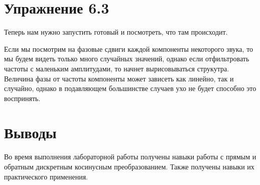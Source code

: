 \documentclass[a4paper,12pt]{report}
\begin{document}
\chapter{Упражнение 6.3}

 Теперь нам нужно запустить готовый  и посмотреть, что там происходит.
    
    Если мы посмотрим на фазовые сдвиги каждой компоненты некоторого звука, то мы будем видеть только много случайных значений, однако если отфильтровать частоты с маленьким амплитудами, то начнет вырисовываться струкутра. Величина фазы от частоты компоненты может зависеть как линейно, так и случайно, однако в подавляющем большинстве случаев ухо не будет способно это воспринять.
    
    

\chapter{Выводы}

Во время выполнения лабораторной работы получены навыки работы с прямым и обратным дискретным косинусным преобразованием. Также получены навыки их практического применения.
\end{document}
